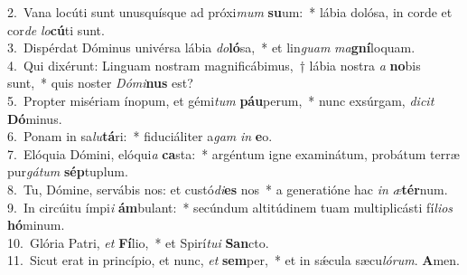 {2.~}Vana locúti sunt unusquísque ad próxi\textit{mum} \textbf{su}um:~* lábia dolósa, in corde et cor\textit{de} \textit{lo}\textbf{cú}ti sunt.\\
{3.~}Dispérdat Dóminus univérsa lábia \textit{do}\textbf{ló}sa,~* et lin\textit{guam} \textit{ma}\textbf{gní}loquam.\\
{4.~}Qui dixérunt: Linguam nostram magnificábimus,~† lábia nostra \textit{a} \textbf{no}bis sunt,~* quis noster \textit{Dó}\textit{mi}\textbf{nus} est?\\
{5.~}Propter misériam ínopum, et gémi\textit{tum} \textbf{páu}perum,~* nunc exsúrgam, \textit{di}\textit{cit} \textbf{Dó}minus.\\
{6.~}Ponam in sa\textit{lu}\textbf{tá}ri:~* fiduciáliter a\textit{gam} \textit{in} \textbf{e}o.\\
{7.~}Elóquia Dómini, elóqui\textit{a} \textbf{ca}sta:~* argéntum igne examinátum, probátum terræ pur\textit{gá}\textit{tum} \textbf{sép}tuplum.\\
{8.~}Tu, Dómine, servábis nos: et custó\textit{di}\textbf{es} nos~* a generatióne hac \textit{in} \textit{æ}\textbf{tér}num.\\
{9.~}In circúitu ímpi\textit{i} \textbf{ám}bulant:~* secúndum altitúdinem tuam multiplicásti fí\textit{li}\textit{os} \textbf{hó}minum.\\
{10.~}Glória Patri, \textit{et} \textbf{Fí}lio,~* et Spirí\textit{tu}\textit{i} \textbf{San}cto.\\
{11.~}Sicut erat in princípio, et nunc, \textit{et} \textbf{sem}per,~* et in sǽcula sæcu\textit{ló}\textit{rum}. \textbf{A}men.\\
